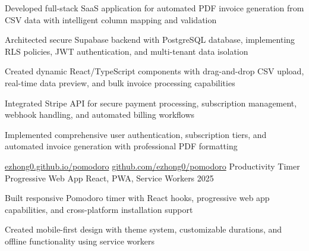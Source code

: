 \documentclass[12pt, letterpaper]{russell}
\begin{document}
\begin{cventries}
{\begin{cvitems}
        \item {Developed full-stack SaaS application for automated PDF invoice generation from CSV data with intelligent column mapping and validation}
        \item {Architected secure Supabase backend with PostgreSQL database, implementing RLS policies, JWT authentication, and multi-tenant data isolation}
        \item {Created dynamic React/TypeScript components with drag-and-drop CSV upload, real-time data preview, and bulk invoice processing capabilities}
        \item {Integrated Stripe API for secure payment processing, subscription management, webhook handling, and automated billing workflows}
        \item {Implemented comprehensive user authentication, subscription tiers, and automated invoice generation with professional PDF formatting}
      \end{cvitems}
    }
    \cvprojectinline
    {\href{https://ezhong0.github.io/pomodoro/}{ezhong0.github.io/pomodoro} \textbar{} \href{https://github.com/ezhong0/pomodoro}{github.com/ezhong0/pomodoro}} %
    {Productivity Timer Progressive Web App} %
    {React, PWA, Service Workers} %
    {2025} %
    {
      \begin{cvitems}
        \item {Built responsive Pomodoro timer with React hooks, progressive web app capabilities, and cross-platform installation support}
        \item {Created mobile-first design with theme system, customizable durations, and offline functionality using service workers}
      \end{cvitems}
    }
\end{cventries}
\vspace{-0.15cm}


\vspace{-0.45cm}
\end{document}
